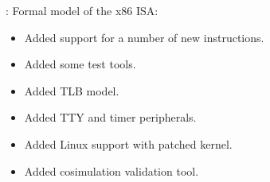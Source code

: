
\begin{frame}

\implibtitle

:
Formal model of the x86 ISA:
\begin{itemize}
\item Added support for a number of new instructions.
\item Added some test tools.
\item Added TLB model.
\item Added TTY and timer peripherals.
\item Added Linux support with patched kernel.
\item Added cosimulation validation tool.
\end{itemize}

\end{frame}



